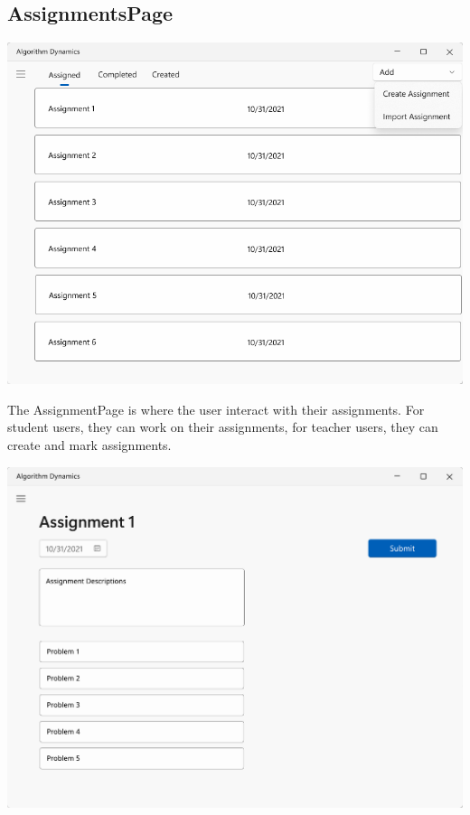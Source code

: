 \documentclass[a4paper]{report}
\begin{document}
\subsection{AssignmentsPage}

\includegraphics[width=\textwidth, height=\textheight, keepaspectratio]{AssignmentsPage-design}

The AssignmentPage is where the user interact with their assignments. For student users, they can work on their assignments, for teacher users, they can create and mark assignments.

\includegraphics[width=\textwidth, height=\textheight, keepaspectratio]{AssignmentsStudentDetailsPage-design}
\end{document}
